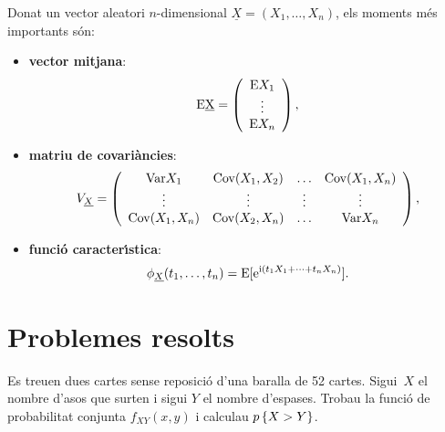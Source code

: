 Donat un vector aleatori $n$-dimensional $\underline{X} = (X_1, \ldots , X_n)$,
els moments m\'es importants s\'on:

\begin{itemize}

\item {\bf vector mitjana}:
$$\rm{E}\underline{X} = \left ( \begin{array}{c} {\rm E}X_1 \\ \vdots \\  {\rm
E}X_n \end{array} \right ),$$

\item {\bf matriu de covari\`ancies}:
$$V_{\underline{X}} = \left ( \begin{array}{cccc} 
{\rm Var} X_1 & {\rm Cov}(X_1,X_2) & \ldots &
{\rm Cov} (X_1,X_n) \\ \vdots & \vdots & \vdots & \vdots \\ 
{\rm Cov} (X_1,X_n) & {\rm Cov} (X_2,X_n) & \ldots & {\rm Var} X_n
\end{array} \right ),$$

\item {\bf funci\'o
caracter\'{\i}stica}:
$$\phi_{\underline{X}}(t_1,\ldots,t_n) = {\rm E} [{\rm e}^{{\rm i}(t_1X_1 + \cdots + t_nX_n)}].$$

\end{itemize}

\section{Problemes resolts}

\begin{probres}
{Es treuen dues cartes sense reposici\'o d'una baralla de 52 cartes.
Sigui~$X$ el nombre d'asos que surten i sigui $Y$ el nombre d'espases. Trobau
la funci\'o de probabilitat conjunta $f_{XY}(x,y)$ i calculau $p\left\{X>Y\right\}$.}
\end{probres}

